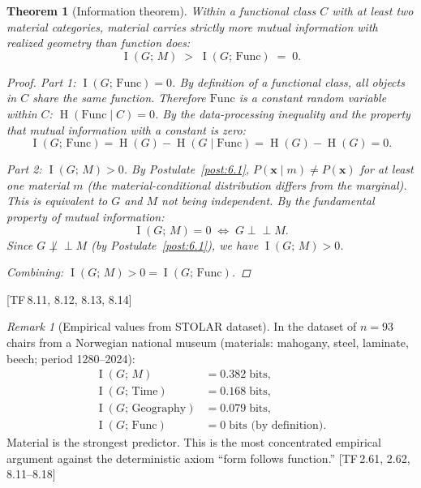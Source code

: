 \documentclass[10pt]{article}
\theoremstyle{definition}
\theoremstyle{plain}
\newtheorem{theorem}[definition]{Theorem}
\theoremstyle{remark}
\newtheorem{remark}[definition]{Remark}
\DeclareMathOperator{\MI}{I}                 %
\DeclareMathOperator{\Ent}{H}                %
\newcommand{\TF}[1]{\textnormal{[TF\,#1]}}  %
\begin{document}
\begin{theorem}[Information theorem]\label{thm:6.2}
Within a functional class $C$ with at least two material categories,
material carries strictly more mutual information with realized geometry
than function does:
\[
  \MI(G;\, M) \;>\; \MI(G;\, \mathrm{Func}) \;=\; 0.
\]

\begin{proof}
\textit{Part 1: $\MI(G;\, \mathrm{Func}) = 0$.}\;
By definition of a functional class, all objects in $C$ share the same
function. Therefore $\mathrm{Func}$ is a constant random variable within
$C$: $\Ent(\mathrm{Func} \mid C) = 0$. By the data-processing
inequality and the property that mutual information with a constant is
zero:
\[
  \MI(G;\, \mathrm{Func}) = \Ent(G) - \Ent(G \mid \mathrm{Func})
  = \Ent(G) - \Ent(G) = 0.
\]

\textit{Part 2: $\MI(G;\, M) > 0$.}\;
By Postulate~\ref{post:6.1}, $P(\bm{x} \mid m) \neq P(\bm{x})$ for
at least one material $m$ (the material-conditional distribution differs
from the marginal). This is equivalent to $G$ and $M$ not being
independent. By the fundamental property of mutual information:
\[
  \MI(G;\, M) = 0 \;\iff\; G \perp\!\!\!\perp M.
\]
Since $G \not\perp\!\!\!\perp M$ (by Postulate~\ref{post:6.1}), we
have $\MI(G;\, M) > 0$.

\textit{Combining:}\; $\MI(G;\, M) > 0 = \MI(G;\, \mathrm{Func})$.
\qedhere
\end{proof}
\end{theorem}

\TF{8.11, 8.12, 8.13, 8.14}

\begin{remark}[Empirical values from STOLAR dataset]
In the dataset of $n = 93$ chairs from a Norwegian national museum
(materials: mahogany, steel, laminate, beech; period 1280--2024):
\begin{align*}
  \MI(G;\, M) &= 0.382 \;\text{bits}, \\
  \MI(G;\, \mathrm{Time}) &= 0.168 \;\text{bits}, \\
  \MI(G;\, \mathrm{Geography}) &= 0.079 \;\text{bits}, \\
  \MI(G;\, \mathrm{Func}) &= 0 \;\text{bits (by definition).}
\end{align*}
Material is the strongest predictor. This is the most concentrated
empirical argument against the deterministic axiom ``form follows
function.'' \TF{2.61, 2.62, 8.11--8.18}
\end{remark}
\end{document}
